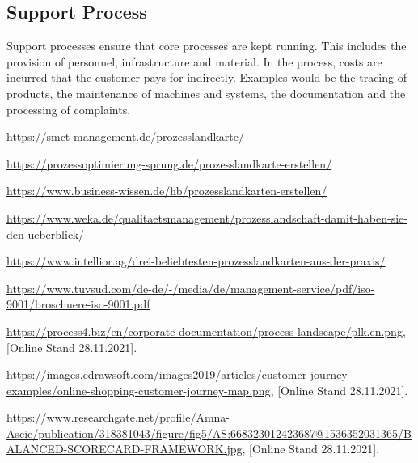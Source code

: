 \documentclass[11pt,a4paper]{article}
\begin{document}
\subsection{Support Process}

Support processes ensure that core processes are kept running. This includes
the provision of personnel, infrastructure and material. In the process, costs
are incurred that the customer pays for indirectly. Examples would be the
tracing of products, the maintenance of machines and systems, the
documentation and the processing of complaints.

\begin{thebibliography}{99}

 \url{https://smct-management.de/prozesslandkarte/}

  \url{https://prozessoptimierung-sprung.de/prozesslandkarte-erstellen/}

  \url{https://www.business-wissen.de/hb/prozesslandkarten-erstellen/}

  \url{https://www.weka.de/qualitaetsmanagement/prozesslandschaft-damit-haben-sie-den-ueberblick/}

  \url{https://www.intellior.ag/drei-beliebtesten-prozesslandkarten-aus-der-praxis/}

  \url{https://www.tuvsud.com/de-de/-/media/de/management-service/pdf/iso-9001/broschuere-iso-9001.pdf}

  \url{https://process4.biz/en/corporate-documentation/process-landscape/plk.en.png}, [Online Stand 28.11.2021].

  \url{https://images.edrawsoft.com/images2019/articles/customer-journey-examples/online-shopping-customer-journey-map.png}, [Online Stand 28.11.2021].

  \url{https://www.researchgate.net/profile/Amna-Ascic/publication/318381043/figure/fig5/AS:668323012423687@1536352031365/BALANCED-SCORECARD-FRAMEWORK.jpg}, [Online Stand 28.11.2021].

\end{thebibliography}
\end{document}
